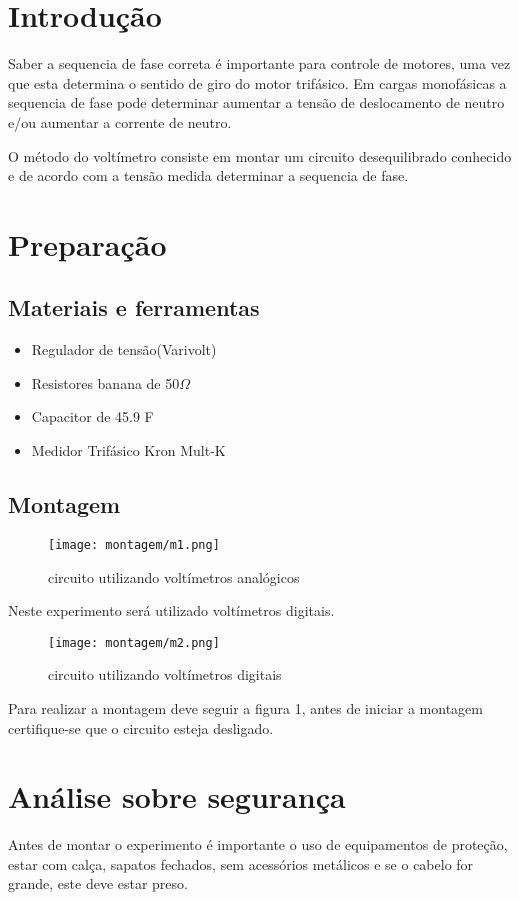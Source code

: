 \documentclass[a4paper, 12pt]{article}
\begin{document}
		\section{Introdução}
		Saber a sequencia de fase correta é importante para controle de motores, uma vez que esta determina o sentido de giro do motor trifásico. Em cargas monofásicas a sequencia de fase pode determinar aumentar a tensão de deslocamento de neutro e/ou aumentar a corrente de neutro.
		
		O método do voltímetro consiste em montar um circuito desequilibrado conhecido e de acordo com a tensão medida determinar a sequencia de fase.
		\section{Preparação}
		\subsection{Materiais e ferramentas}
			\begin{itemize}
				\item Regulador de tensão(Varivolt)
				\item Resistores banana de 50\(\Omega\)
				\item Capacitor de 45.9 \si{\micro}F
				\item Medidor Trifásico Kron Mult-K
			\end{itemize}
			\subsection{Montagem}
			\begin{figure}[H]
				\centering %
				\texttt{[image: montagem/m1.png]}
				\caption{circuito utilizando voltímetros analógicos}
			\end{figure}
			Neste experimento será utilizado voltímetros digitais.
			\begin{figure}[H]
				\centering %
				\texttt{[image: montagem/m2.png]}
				\caption{circuito utilizando voltímetros digitais}
			\end{figure}
			Para realizar a montagem deve seguir a figura 1, antes de iniciar a montagem certifique-se que o circuito esteja desligado.
			
			\section{Análise sobre segurança}
		\justifying
		Antes de montar o experimento é importante o uso de equipamentos de proteção, estar com calça, sapatos fechados, sem acessórios metálicos e se o cabelo for grande, este deve estar preso.
		
\end{document}

